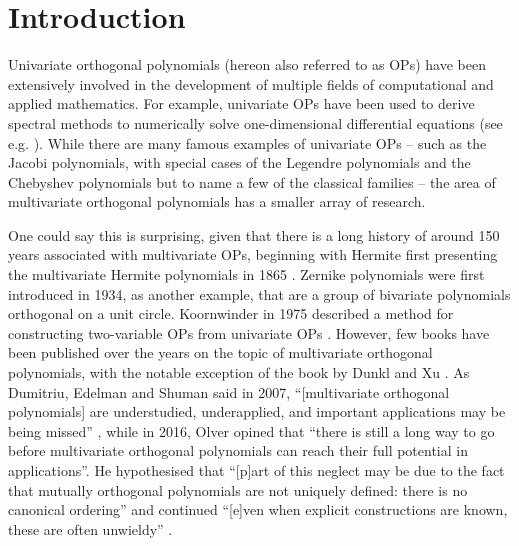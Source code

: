 
\chapter{Introduction}\label{CHAPTER:intro}


Univariate orthogonal polynomials (hereon also referred to as OPs) have been extensively involved in the development of multiple fields of computational and applied mathematics. For example, univariate OPs have been used to derive spectral methods to numerically solve one-dimensional differential equations (see e.g. \cite{trefethen2000spectral, canuto2007spectral, gottlieb1977numerical, boyd2001chebyshev, mason2002chebyshev, shen2011spectral, olver2013fast}). While there are many famous examples of univariate OPs -- such as the Jacobi polynomials, with special cases of the Legendre polynomials and the Chebyshev polynomials but to name a few of the classical families \cite[\S18.3]{DLMF} -- the area of multivariate orthogonal polynomials has a smaller array of research. 

One could say this is surprising, given that there is a long history of around 150 years associated with multivariate OPs, beginning with Hermite first presenting the multivariate Hermite polynomials in 1865 \cite{appel1926fonctions, ismail2017review}. Zernike polynomials \cite{zernike1934diffraction} were first introduced in 1934, as another example, that are a group of bivariate polynomials orthogonal on a unit circle. Koornwinder in 1975 described a method for constructing two-variable OPs from univariate OPs \cite{koornwinder1975two}. However, few books have been published over the years on the topic of multivariate orthogonal polynomials, with the notable exception of the book by Dunkl and Xu \cite{dunkl2014orthogonal}. As Dumitriu, Edelman and Shuman said in 2007, \enquote{[multivariate orthogonal polynomials] are understudied, underapplied, and important applications may be being missed} \cite{dumitriu2007mops}, while in 2016, Olver opined that \enquote{there is still a long way to go before multivariate orthogonal polynomials can reach their full potential in applications}. He hypothesised that \enquote{[p]art of this neglect may be due to the fact that mutually orthogonal polynomials are not uniquely defined: there is no canonical ordering} and continued \enquote{[e]ven when explicit constructions are known, these are often unwieldy} \cite{olver2016review}.

